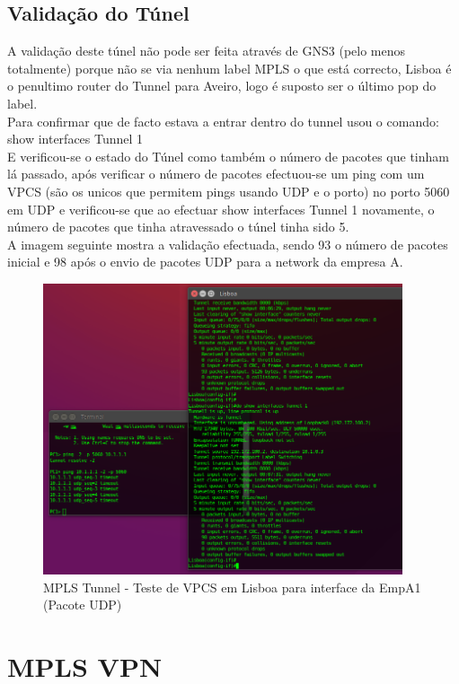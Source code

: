 \documentclass[11pt,a4paper]{report}
\begin{document}
\subsection{Validação do Túnel}

A validação deste túnel não pode ser feita através de GNS3 (pelo menos totalmente) porque não se via nenhum label MPLS o que está correcto, Lisboa é o penultimo router do Tunnel para Aveiro, logo é suposto ser o último pop do label.\\

Para confirmar que de facto estava a entrar dentro do tunnel usou o comando: show interfaces Tunnel 1\\

E verificou-se o estado do Túnel como também o número de pacotes que tinham lá passado, após verificar o número de pacotes efectuou-se um ping com um VPCS (são os unicos que permitem pings usando UDP e o porto) no porto 5060 em UDP e verificou-se que ao efectuar show interfaces Tunnel 1 novamente, o número de pacotes que tinha atravessado o túnel tinha sido 5.\\

A imagem seguinte mostra a validação efectuada, sendo 93 o número de pacotes inicial e 98 após o envio de pacotes UDP para a network da empresa A.\\

\begin{figure}[H]
\centerline{\includegraphics[width=300pt]{tunnel_mpls.png}}
\caption{MPLS Tunnel - Teste de VPCS em Lisboa para interface da EmpA1 (Pacote UDP)}
\label{schema}
\end{figure}

\section{MPLS VPN}
\end{document}
